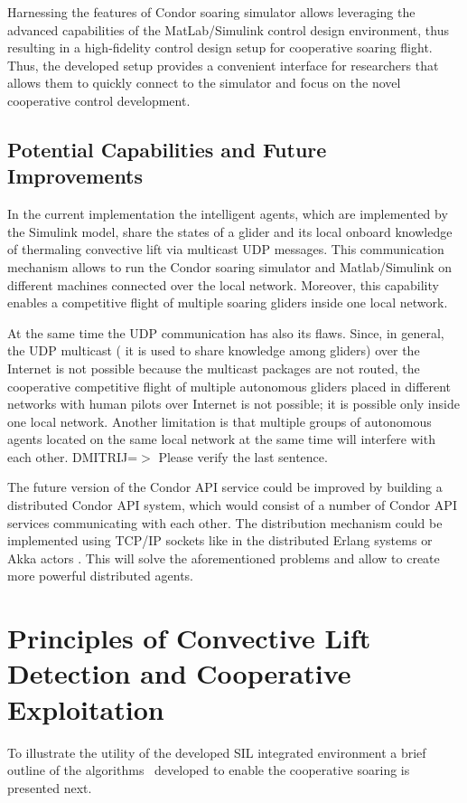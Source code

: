\documentclass[letterpaper, 10 pt, conference]{ieeeconf}  %
\begin{document}
Harnessing the features of Condor soaring simulator allows leveraging the advanced capabilities of the MatLab/Simulink control design environment, thus resulting in a high-fidelity control design setup for cooperative soaring flight. Thus, the developed setup provides a convenient interface for researchers that allows them to quickly connect to the simulator and focus on the novel cooperative control development.

\subsection{Potential Capabilities and Future Improvements}

In the current implementation the intelligent agents, which are implemented by the Simulink model, share the states of a glider and its local onboard knowledge of thermaling convective lift via multicast UDP messages. This communication mechanism allows to run the Condor soaring simulator and Matlab/Simulink on different machines connected over the local network. Moreover, this capability enables a competitive flight of multiple soaring gliders inside one local network.

At the same time the UDP communication has also its flaws. Since, in general, the UDP multicast ( it is used to share knowledge among gliders) over the Internet is not possible because the multicast packages are not routed, the cooperative competitive flight of multiple autonomous gliders placed in different networks with human pilots over Internet is not possible; it is possible only inside one local network. Another limitation is that multiple groups of autonomous agents located on the same local network at the same time will interfere with each other. DMITRIJ=$>$ Please verify the last sentence.

The future version of the Condor API service could be improved by building a distributed Condor API system, which would consist of a number of Condor API services communicating with each other. The distribution mechanism could be implemented using TCP/IP sockets like in the distributed Erlang systems \cite{Erlang:2013:Online} or Akka actors \cite{Akka:2013:Online}. This will solve the aforementioned problems and allow to create more powerful distributed agents.

\section{Principles of Convective Lift Detection and Cooperative Exploitation}
To illustrate the utility of the developed SIL integrated environment a brief outline of the algorithms~\cite{AKlass_JGCD:2012} developed to enable the cooperative soaring is presented next.
\end{document}
